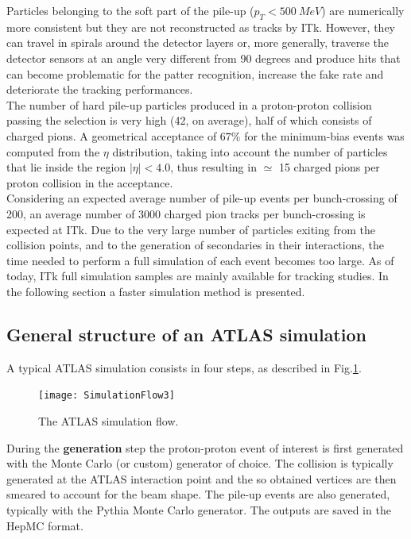 \documentclass[a4paper,twoside,12pt]{article}
\begin{document}
Particles belonging to the soft part of the pile-up ($p_{T} < 500\ MeV$) are numerically more consistent but 
they are not reconstructed as tracks by ITk. However, they can travel in spirals around the 
detector layers or, more generally, traverse the detector sensors at an angle very different
from 90 degrees and produce hits that can become problematic for the patter recognition, increase the fake rate and deteriorate the tracking
performances. \\

The number of hard pile-up particles produced in a proton-proton collision passing the selection is very high (42, on average), 
half of which consists of charged pions. A geometrical acceptance of $67\%$ for the minimum-bias events was computed from the $\eta$ distribution, taking into account the number of particles that 
lie inside the region $|\eta| < 4.0$, thus resulting in $\simeq$ 15 charged pions per proton collision in 
the acceptance.\\

Considering an expected average number of pile-up events per bunch-crossing of 200, an average number of 3000 charged pion tracks per bunch-crossing is expected at ITk.
Due to the very large number of particles exiting from the collision points, and to the generation of secondaries in their interactions, the time
needed to perform a full simulation of each event becomes too large.
As of today, ITk full simulation samples are mainly available for tracking studies. In the following section a faster simulation method is presented.

\subsection{General structure of an ATLAS simulation}
A typical ATLAS simulation consists in four steps, as described in Fig.\ref{fig:simulationFlow}.

\begin{figure} [h]
	\texttt{[image: SimulationFlow3]}
	\caption{The ATLAS simulation flow. }
	\label{fig:simulationFlow}
\end{figure}

During the \textbf{generation} step the proton-proton event of interest is first generated with the Monte
Carlo (or custom) generator of choice. The collision is typically generated at the ATLAS 
interaction point and the so obtained vertices are then smeared to account for the beam 
shape. The pile-up events are also generated, typically with the Pythia Monte Carlo generator. The outputs are saved in the HepMC format. \\
\end{document}
